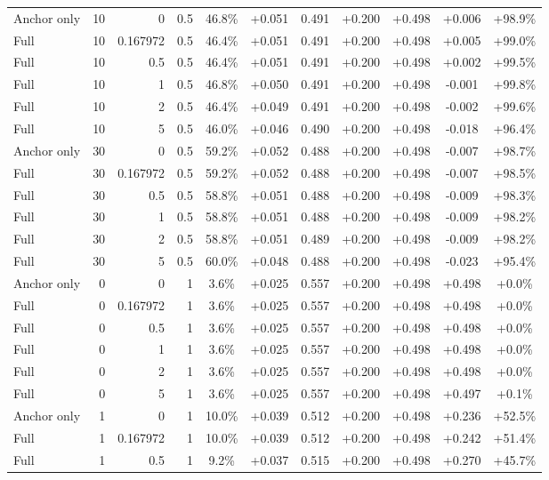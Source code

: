 \begin{table}[htbp]
\begin{tabular}{lrrrccccccc}
Anchor only & 10 & 0 & 0.5 & 46.8\% & +0.051 & 0.491 & +0.200 & +0.498 & +0.006 & +98.9\% \\
Full & 10 & 0.167972 & 0.5 & 46.4\% & +0.051 & 0.491 & +0.200 & +0.498 & +0.005 & +99.0\% \\
Full & 10 & 0.5 & 0.5 & 46.4\% & +0.051 & 0.491 & +0.200 & +0.498 & +0.002 & +99.5\% \\
Full & 10 & 1 & 0.5 & 46.8\% & +0.050 & 0.491 & +0.200 & +0.498 & -0.001 & +99.8\% \\
Full & 10 & 2 & 0.5 & 46.4\% & +0.049 & 0.491 & +0.200 & +0.498 & -0.002 & +99.6\% \\
Full & 10 & 5 & 0.5 & 46.0\% & +0.046 & 0.490 & +0.200 & +0.498 & -0.018 & +96.4\% \\
Anchor only & 30 & 0 & 0.5 & 59.2\% & +0.052 & 0.488 & +0.200 & +0.498 & -0.007 & +98.7\% \\
Full & 30 & 0.167972 & 0.5 & 59.2\% & +0.052 & 0.488 & +0.200 & +0.498 & -0.007 & +98.5\% \\
Full & 30 & 0.5 & 0.5 & 58.8\% & +0.051 & 0.488 & +0.200 & +0.498 & -0.009 & +98.3\% \\
Full & 30 & 1 & 0.5 & 58.8\% & +0.051 & 0.488 & +0.200 & +0.498 & -0.009 & +98.2\% \\
Full & 30 & 2 & 0.5 & 58.8\% & +0.051 & 0.489 & +0.200 & +0.498 & -0.009 & +98.2\% \\
Full & 30 & 5 & 0.5 & 60.0\% & +0.048 & 0.488 & +0.200 & +0.498 & -0.023 & +95.4\% \\
Anchor only & 0 & 0 & 1 & 3.6\% & +0.025 & 0.557 & +0.200 & +0.498 & +0.498 & +0.0\% \\
Full & 0 & 0.167972 & 1 & 3.6\% & +0.025 & 0.557 & +0.200 & +0.498 & +0.498 & +0.0\% \\
Full & 0 & 0.5 & 1 & 3.6\% & +0.025 & 0.557 & +0.200 & +0.498 & +0.498 & +0.0\% \\
Full & 0 & 1 & 1 & 3.6\% & +0.025 & 0.557 & +0.200 & +0.498 & +0.498 & +0.0\% \\
Full & 0 & 2 & 1 & 3.6\% & +0.025 & 0.557 & +0.200 & +0.498 & +0.498 & +0.0\% \\
Full & 0 & 5 & 1 & 3.6\% & +0.025 & 0.557 & +0.200 & +0.498 & +0.497 & +0.1\% \\
Anchor only & 1 & 0 & 1 & 10.0\% & +0.039 & 0.512 & +0.200 & +0.498 & +0.236 & +52.5\% \\
Full & 1 & 0.167972 & 1 & 10.0\% & +0.039 & 0.512 & +0.200 & +0.498 & +0.242 & +51.4\% \\
Full & 1 & 0.5 & 1 & 9.2\% & +0.037 & 0.515 & +0.200 & +0.498 & +0.270 & +45.7\% \\

\end{tabular}
\end{table}
